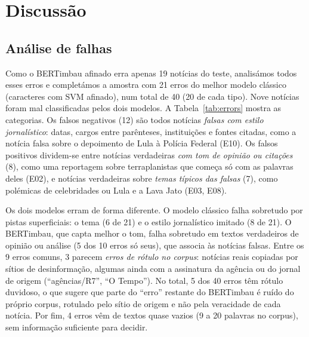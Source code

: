 \section{Discussão}\label{sec:discussao}

\subsection{Análise de falhas}
Como o BERTimbau afinado erra apenas 19 notícias do teste, analisámos todos esses erros e
completámos a amostra com 21 erros do melhor modelo clássico (caracteres com SVM afinado), num total
de 40 (20 de cada tipo). Nove notícias foram mal classificadas pelos dois modelos.
A Tabela~\ref{tab:errors} mostra as categorias. Os falsos negativos (12) são todos notícias
\emph{falsas com estilo jornalístico}: datas, cargos entre parênteses, instituições e fontes citadas,
como a notícia falsa sobre o depoimento de Lula à Polícia Federal (E10). Os falsos positivos
dividem-se entre notícias verdadeiras \emph{com tom de opinião ou citações} (8), como uma reportagem
sobre terraplanistas que começa só com as palavras deles (E02), e notícias verdadeiras sobre
\emph{temas típicos das falsas} (7), como polémicas de celebridades ou Lula e a Lava Jato (E03, E08).

Os dois modelos erram de forma diferente. O modelo clássico falha sobretudo por pistas
superficiais: o tema (6 de 21) e o estilo jornalístico imitado (8 de 21). O BERTimbau, que capta
melhor o tom, falha sobretudo em textos verdadeiros de opinião ou análise (5 dos 10 erros só
seus), que associa às notícias falsas. Entre os 9 erros comuns, 3 parecem \emph{erros de rótulo
no corpus}: notícias reais copiadas por sítios de desinformação, algumas ainda com a assinatura da
agência ou do jornal de origem (``agências/R7'', ``O Tempo''). No total, 5 dos 40 erros têm
rótulo duvidoso, o que sugere que parte do ``erro'' restante do BERTimbau é ruído do próprio corpus,
rotulado pelo sítio de origem e não pela veracidade de cada notícia. Por fim, 4 erros vêm de textos
quase vazios (9 a 20 palavras no corpus), sem informação suficiente para decidir.




